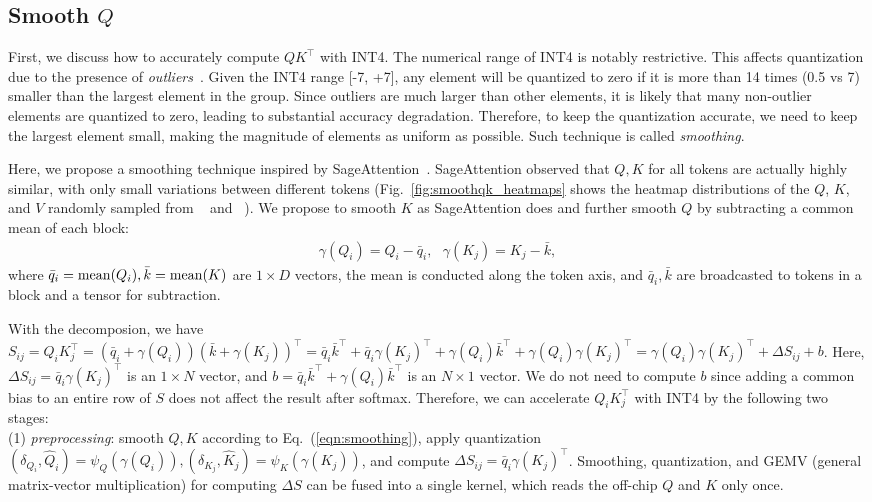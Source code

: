 \subsection{Smooth $Q$}
First, we discuss how to accurately compute $QK^\top$ with INT4. 
The numerical range of INT4 is notably restrictive. This affects quantization due to the presence of \emph{outliers}~\cite{lin2024qserve}. Given the INT4 range [-7, +7], any element will be quantized to zero if it is more than 14 times (0.5 vs 7) smaller than the largest element in the group. Since outliers are much larger than other elements, it is likely that many non-outlier elements are quantized to zero, leading to substantial accuracy degradation.
Therefore, to keep the quantization accurate, we need to keep the largest element small, making the magnitude of elements as uniform as possible. Such technique is called \emph{smoothing}.

Here, we propose a smoothing technique inspired by SageAttention~\cite{2024sageattention}. SageAttention observed that $Q, K$ for all tokens are actually highly similar, with only small variations between different tokens (Fig.~\ref{fig:smoothqk_heatmaps} shows the heatmap distributions of the $Q$, $K$, and $V$ randomly sampled from \llamal~\cite{llama31model} and \cogvideo~\cite{yang2024cogvideox}). 
We propose to smooth $K$ as SageAttention does and further smooth $Q$ by subtracting a common mean of each block:
\begin{align} \label{eqn:smoothing}
\gamma(Q_i) = Q_i - \bar q_i,~~~\gamma(K_j)=K_j-\bar k,
\end{align}
where $\bar q_i=\mathrm{mean}(Q_i), \bar k=\mathrm{mean}(K)$ are  $1\times D$ vectors, the mean is conducted along the token axis, and $\bar q_i, \bar k$ are broadcasted to tokens in a block and a tensor for subtraction. 

With the decomposion, we have $S_{ij}=Q_iK_j^\top=(\bar q_i+\gamma(Q_i))(\bar k+\gamma(K_j))^\top = \bar q_i\bar k^\top + \bar q_i \gamma(K_j)^\top + \gamma(Q_i) \bar k^\top + \gamma(Q_i)\gamma(K_j)^\top =  \gamma(Q_i)\gamma(K_j)^\top + \Delta {S_{ij}} + b$. Here, $\Delta {S_{ij}}=\bar q_i \gamma(K_j)^\top$ is an $1\times N$ vector, and $b=\bar q_i\bar k^\top + \gamma(Q_i) \bar k^\top$ is an $N\times 1$ vector. We do not need to compute $b$  since adding a common bias to an entire row of $S$ does not affect the result after softmax. 
Therefore, we can accelerate $Q_iK_j^\top$ with INT4 by the following two stages:\\
(1) \emph{preprocessing}: smooth $Q, K$ according to  Eq.~(\ref{eqn:smoothing}), apply quantization $(\delta_{Q_i}, \hat Q_i) = \psi_Q(\gamma(Q_i)),(\delta_{K_j}, \hat K_j) = \psi_K(\gamma(K_j))
$, and compute $\Delta{S_{ij}} = \bar q_i\gamma(K_j)^\top$. Smoothing, quantization, and GEMV (general matrix-vector multiplication) for computing $\Delta S$ can be fused into a single kernel, which reads the off-chip $Q$ and $K$ only once.

